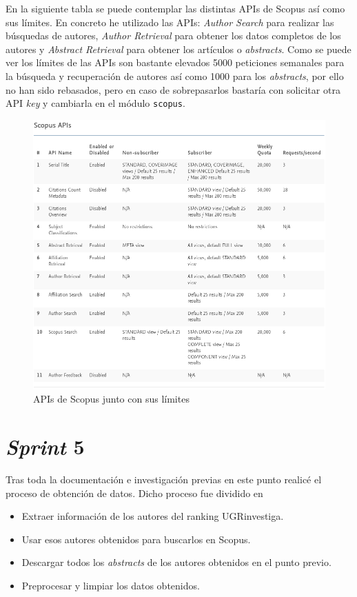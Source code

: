 En la siguiente tabla se puede contemplar las distintas \acrshort{API}s de Scopus así como sus límites. En concreto he utilizado las \acrshort{API}s: \textit{Author Search} para realizar las búsquedas de autores, \textit{Author Retrieval} para obtener los datos completos de los autores y \textit{Abstract Retrieval} para obtener los artículos o \textit{abstracts}. 
Como se puede ver los límites de las \acrshort{API}s son bastante elevados 5000 peticiones semanales para la búsqueda y recuperación de autores así como 1000 para los \textit{abstracts}, por ello no han sido rebasados, pero en caso de sobrepasarlos bastaría con solicitar otra \acrshort{API} \textit{key} y cambiarla en el módulo \texttt{scopus}.

\begin{figure}[h]
	
	\centering
	\includegraphics[width=\linewidth]{imagenes/scopusAPIs}
	\caption{ \acrshort{API}s de Scopus junto con sus límites}
\end{figure}
\section{\textit{Sprint} 5}
Tras toda la documentación e investigación previas en este punto realicé el proceso de obtención de datos. Dicho proceso fue dividido en 
\begin{itemize}
	\item Extraer información de los autores del ranking UGRinvestiga.
	\item Usar esos autores obtenidos para buscarlos en Scopus.
	\item Descargar todos los \textit{abstracts} de los autores obtenidos en el punto previo.
	\item Preprocesar y limpiar los datos obtenidos.
\end{itemize}

